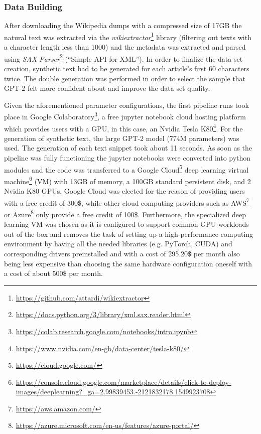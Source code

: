 \subsubsection{Data Building}
\label{sub:data_building}

After downloading the Wikipedia dumps with a compressed size of 17GB the natural text was extracted via the \textit{wikiextractor}\footnote{\url{https://github.com/attardi/wikiextractor}} library (filtering out texts with a character length less than 1000) and the metadata was extracted and parsed using \textit{SAX Parser}\footnote{\url{https://docs.python.org/3/library/xml.sax.reader.html}} (“Simple API for XML”). In order to finalize the data set creation, synthetic text had to be generated for each article’s first 60 characters twice.
The double generation was performed in order to select the sample that GPT-2 felt more confident about and improve the data set quality.

Given the aforementioned parameter configurations, the first pipeline runs took place in Google Colaboratory\footnote{\url{https://colab.research.google.com/notebooks/intro.ipynb}}, a free jupyter notebook cloud hosting platform which provides users with a GPU, in this case, an Nvidia Tesla K80\footnote{\url{https://www.nvidia.com/en-gb/data-center/tesla-k80/}}. For the generation of synthetic text, the large GPT-2 model (774M parameters) was used. The generation of each text snippet took about 11 seconds. As soon as the pipeline was fully functioning the jupyter notebooks were converted into python modules and the code was transferred to a Google Cloud\footnote{\url{https://cloud.google.com/}} deep learning virtual machine\footnote{\url{https://console.cloud.google.com/marketplace/details/click-to-deploy-images/deeplearning?_ga=2.99839453.-2121832178.1549923708}} (VM) with 13GB of memory, a 100GB standard persistent disk, and 2 Nvidia K80 GPUs. Google Cloud was elected for the reason of providing users with a free credit of 300\$, while other cloud computing providers such as AWS\footnote{\url{https://aws.amazon.com/}} or Azure\footnote{\url{https://azure.microsoft.com/en-us/features/azure-portal/}} only provide a free credit of 100\$. Furthermore, the specialized deep learning VM was chosen as it is configured to support common GPU workloads out of the box and removes the task of setting up a high-performance computing environment by having all the needed libraries (e.g. PyTorch, CUDA) and corresponding drivers preinstalled and with a cost of 295.20\$ per month also being less expensive than choosing the same hardware configuration oneself with a cost of about 500\$ per month.

